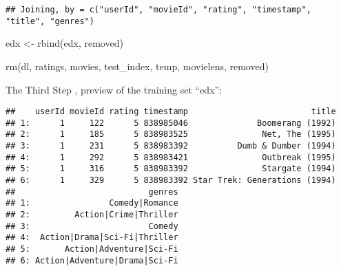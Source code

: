 \documentclass[
]{article}
\newenvironment{Shaded}{\begin{snugshade}}{\end{snugshade}}
\newcommand{\AttributeTok}[1]{\textcolor[rgb]{0.77,0.63,0.00}{#1}}
\newcommand{\ConstantTok}[1]{\textcolor[rgb]{0.00,0.00,0.00}{#1}}
\newcommand{\DecValTok}[1]{\textcolor[rgb]{0.00,0.00,0.81}{#1}}
\newcommand{\FloatTok}[1]{\textcolor[rgb]{0.00,0.00,0.81}{#1}}
\newcommand{\FunctionTok}[1]{\textcolor[rgb]{0.00,0.00,0.00}{#1}}
\newcommand{\NormalTok}[1]{#1}
\newcommand{\OtherTok}[1]{\textcolor[rgb]{0.56,0.35,0.01}{#1}}
\newcommand{\SpecialCharTok}[1]{\textcolor[rgb]{0.00,0.00,0.00}{#1}}
\newcommand{\StringTok}[1]{\textcolor[rgb]{0.31,0.60,0.02}{#1}}
\begin{document}
\begin{Shaded}
\end{Shaded}

\begin{verbatim}
## Joining, by = c("userId", "movieId", "rating", "timestamp", "title", "genres")
\end{verbatim}

\begin{Shaded}
\begin{Highlighting}[]
\NormalTok{  edx }\OtherTok{\textless{}{-}} \FunctionTok{rbind}\NormalTok{(edx, removed)}
  
  \FunctionTok{rm}\NormalTok{(dl, ratings, movies, test\_index, temp, movielens, removed)}
\end{Highlighting}
\end{Shaded}

The Third Step , preview of the training set ``edx'':

\begin{verbatim}
##    userId movieId rating timestamp                         title
## 1:      1     122      5 838985046              Boomerang (1992)
## 2:      1     185      5 838983525               Net, The (1995)
## 3:      1     231      5 838983392          Dumb & Dumber (1994)
## 4:      1     292      5 838983421               Outbreak (1995)
## 5:      1     316      5 838983392               Stargate (1994)
## 6:      1     329      5 838983392 Star Trek: Generations (1994)
##                           genres
## 1:                Comedy|Romance
## 2:         Action|Crime|Thriller
## 3:                        Comedy
## 4:  Action|Drama|Sci-Fi|Thriller
## 5:       Action|Adventure|Sci-Fi
## 6: Action|Adventure|Drama|Sci-Fi
\end{verbatim}
\end{document}
